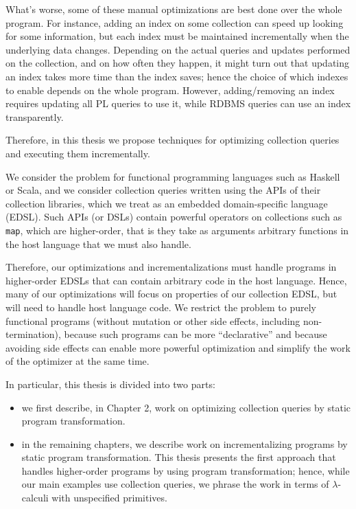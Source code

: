 \documentclass{book}
\begin{document}
What's worse, some of these manual optimizations are best done over the whole
program. For instance, adding an index on some collection can speed up looking
for some information, but each index must be maintained incrementally when the
underlying data changes. Depending on the actual queries and updates performed
on the collection, and on how often they happen, it might turn out that updating
an index takes more time than the index saves; hence the choice of which indexes
to enable depends on the whole program. However, adding/removing an index
requires updating all PL queries to use it, while RDBMS queries can use an index
transparently.

Therefore, in this thesis we propose techniques for optimizing collection
queries and executing them incrementally.

We consider the problem for functional programming languages such as Haskell or
Scala, and we consider collection queries written using the APIs of their
collection libraries, which we treat as an embedded domain-specific language (EDSL). Such
APIs (or DSLs) contain powerful operators on collections such as \texttt{map}, which are higher-order, that
is they take as arguments arbitrary functions in the host language that we must
also handle.

Therefore, our optimizations and incrementalizations must handle programs in
higher-order EDSLs that can contain arbitrary code in the host language. Hence,
many of our optimizations will focus on properties of our collection EDSL, but
will need to handle host language code. We restrict the problem to purely
functional programs (without mutation or other side effects, including
non-termination), because such programs can be more ``declarative'' and because
avoiding side effects can enable more powerful optimization and simplify the
work of the optimizer at the same time.

In particular, this thesis is divided into two parts:
\begin{itemize}
\item we first describe, in Chapter 2, work on optimizing collection queries by static program transformation.
\item in the remaining chapters, we describe work on incrementalizing programs
  by static program transformation. This thesis presents the first approach that
  handles higher-order programs by using program transformation; hence, while
  our main examples use collection queries, we phrase the work in terms of
  $\lambda$-calculi with unspecified primitives.
\end{itemize}
\end{document}
